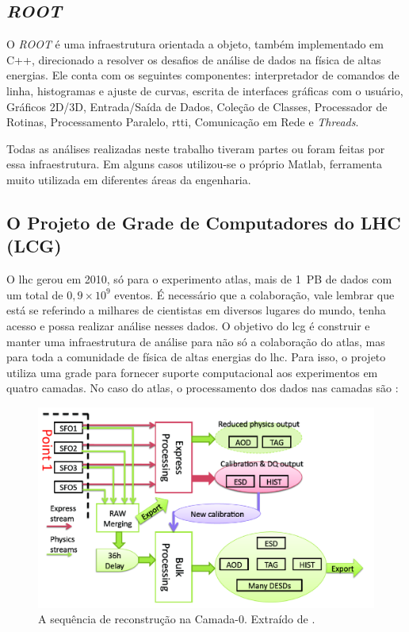 \subsection{\emph{ROOT}}
\label{ssec:root}

O \emph{ROOT} é uma infraestrutura orientada a objeto, também implementado em C++, 
direcionado a resolver os desafios de análise de dados na física de altas 
energias. Ele conta com os seguintes componentes: interpretador de comandos 
de linha, histogramas e ajuste de curvas, escrita de interfaces gráficas com 
o usuário, Gráficos 2D/3D, Entrada/Saída de Dados, Coleção de Classes, 
Processador de Rotinas, Processamento Paralelo, \gls{rtti}, Comunicação em
Rede e \emph{Threads}.

Todas as análises realizadas neste trabalho tiveram partes ou foram feitas por essa
infraestrutura. Em alguns casos utilizou-se o próprio Matlab, ferramenta muito
utilizada em diferentes áreas da engenharia.

\subsection{O Projeto de Grade de Computadores do LHC (LCG)}
\label{ssec:lcg}

O \gls{lhc} gerou em 2010, só para o experimento \gls{atlas}, mais de 1~PB de dados
com um total de $0,9 \times 10^9$ eventos. É necessário que a colaboração, 
vale lembrar que está se referindo a milhares de cientistas em diversos lugares
do mundo, tenha acesso e possa realizar análise nesses dados. 
O objetivo do \gls{lcg} é construir e manter uma 
infraestrutura de análise para não só a colaboração do \gls{atlas}, mas para toda 
a comunidade de física de altas energias do \gls{lhc}.
Para isso, o projeto utiliza uma grade para fornecer suporte computacional 
aos experimentos em quatro camadas. No caso do \gls{atlas}, o processamento dos
dados nas camadas são \cite{grid,atlas_computing_tdr,tier0_reconstruction_atlas}:

\begin{figure}[h!t]
\centering
\includegraphics[width=\textwidth]{imagens/tier0_stream.png}
\caption[A sequência de reconstrução na Camada-0]{A sequência de reconstrução na Camada-0. Extraído de
\cite{tier0_reconstruction_atlas}.}
\label{fig:tier0_stream}
\end{figure}

